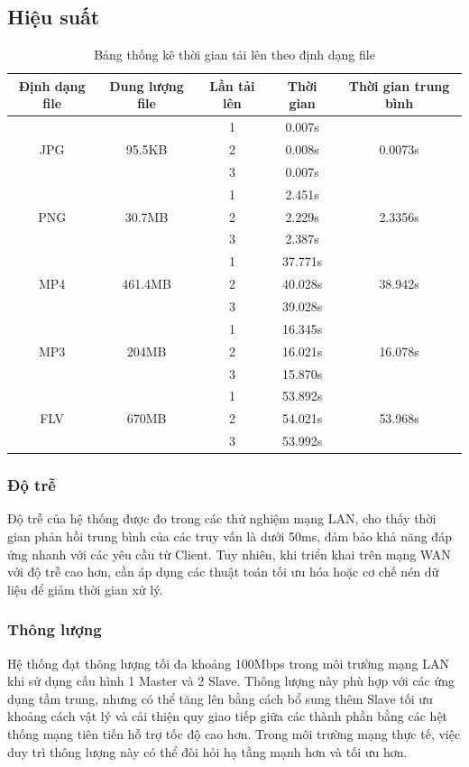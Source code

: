 \documentclass[../main.tex]{subfiles}
\begin{document}
\subsection{Hiệu suất}
\begin{table}[h]
\centering
\begin{tabular}{|c|c|c|c|c|}
\hline
\textbf{Định dạng file} & \textbf{Dung lượng file} & \textbf{Lần tải lên} & \textbf{Thời gian} & \textbf{Thời gian trung bình} \\
\hline
\multirow{3}{*}{JPG} & \multirow{3}{*}{95.5KB} & 1 & 0.007s & \multirow{3}{*}{0.0073s} \\
& & 2 & 0.008s & \\
& & 3 & 0.007s & \\
\hline
\multirow{3}{*}{PNG} & \multirow{3}{*}{30.7MB} & 1 & 2.451s & \multirow{3}{*}{2.3356s} \\
& & 2 & 2.229s & \\
& & 3 & 2.387s & \\
\hline
\multirow{3}{*}{MP4} & \multirow{3}{*}{461.4MB} & 1 & 37.771s & \multirow{3}{*}{38.942s} \\
& & 2 & 40.028s & \\
& & 3 & 39.028s & \\
\hline
\multirow{3}{*}{MP3} & \multirow{3}{*}{204MB} & 1 & 16.345s & \multirow{3}{*}{16.078s} \\
& & 2 & 16.021s & \\
& & 3 & 15.870s & \\
\hline
\multirow{3}{*}{FLV} & \multirow{3}{*}{670MB} & 1 & 53.892s & \multirow{3}{*}{53.968s} \\
& & 2 & 54.021s & \\
& & 3 & 53.992s & \\
\hline
\end{tabular}
\caption{Bảng thống kê thời gian tải lên theo định dạng file}
\end{table}
\subsubsection{Độ trễ} Độ trễ của hệ thống được đo trong các thử nghiệm mạng LAN, cho thấy thời gian phản hồi trung bình của các truy vấn là dưới 50ms, đảm bảo khả năng đáp ứng nhanh với các yêu cầu từ Client. Tuy nhiên, khi triển khai trên mạng WAN với độ trễ cao hơn, cần áp dụng các thuật toán tối ưu hóa hoặc cơ chế nén dữ liệu để giảm thời gian xử lý. \\
\subsubsection{Thông lượng} Hệ thống đạt thông lượng tối đa khoảng 100Mbps trong môi trường mạng LAN khi sử dụng cấu hình 1 Master và 2 Slave. Thông lượng này phù hợp với các ứng dụng tầm trung, nhưng có thể tăng lên bằng cách bổ sung thêm Slave tối ưu khoảng cách vật lý và cải thiện quy giao tiếp giữa các thành phần bằng các hệt thống mạng tiên tiến hỗ trợ tốc độ cao hơn. Trong môi trường mạng thực tế, việc duy trì thông lượng này có thể đòi hỏi hạ tầng mạnh hơn và tối ưu hơn.
\end{document}
